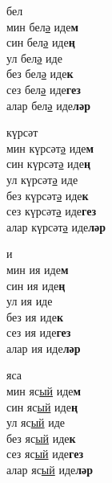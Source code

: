 \begin{multicols}{4}
\begin{enumerate}
\begin{minipage}{\linewidth}
    \item
    бел\\
    мин бел\underline{ә} иде\textbf{м}\\
    син бел\underline{ә} иде\textbf{ң}\\
    ул бел\underline{ә} иде\\
    без бел\underline{ә} иде\textbf{к}\\
    сез бел\underline{ә} иде\textbf{гез}\\
    алар бел\underline{ә} иде\textbf{ләр}\\
\end{minipage}

\begin{minipage}{\linewidth}
    \item
    күрсәт\\
    мин күрсәт\underline{ә} иде\textbf{м}\\
    син күрсәт\underline{ә} иде\textbf{ң}\\
    ул күрсәт\underline{ә} иде\\
    без күрсәт\underline{ә} иде\textbf{к}\\
    сез күрсәт\underline{ә} иде\textbf{гез}\\
    алар күрсәт\underline{ә} иде\textbf{ләр}\\
\end{minipage}

\begin{minipage}{\linewidth}
    \item
    и\\
    мин ия иде\textbf{м}\\
    син ия иде\textbf{ң}\\
    ул ия иде\\
    без ия иде\textbf{к}\\
    сез ия иде\textbf{гез}\\
    алар ия иде\textbf{ләр}\\
\end{minipage}

\begin{minipage}{\linewidth}
    \item
    яса\\
    мин яс\underline{ый} иде\textbf{м}\\
    син яс\underline{ый} иде\textbf{ң}\\
    ул яс\underline{ый} иде\\
    без яс\underline{ый} иде\textbf{к}\\
    сез яс\underline{ый} иде\textbf{гез}\\
    алар яс\underline{ый} иде\textbf{ләр}\\
\end{minipage}


\end{enumerate}
\end{multicols}
